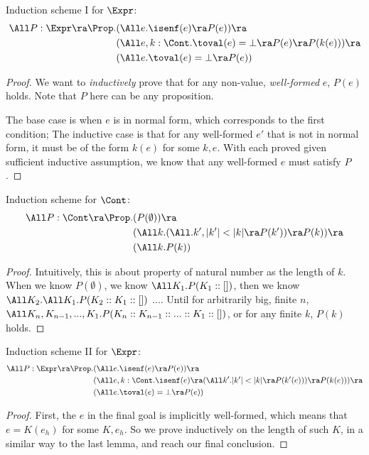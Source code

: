 \begin{lemma}
Induction scheme I for $\Expr$:
\begin{align*}
\All P: \Expr \ra \Prop.
  &(\All e. \isenf(e) \ra P(e)) \ra \\
  &(\All e, k: \Cont . \toval(e) = \bot \ra P(e) \ra P(k(e))) \ra\\
  &(\All e. \toval(e) = \bot \ra P(e))
\end{align*}
\end{lemma}
\begin{proof}
We want to \emph{inductively} prove that for any non-value, \emph{well-formed} $e$, $P(e)$ holds.
Note that $P$ here can be any proposition.

The base case is when $e$ is in normal form, which corresponds to the first condition;
The inductive case is that for any well-formed $e'$ that is not in normal form,
it must be of the form $k(e)$ for some $k, e$. With each proved given sufficient inductive
assumption, we know that any well-formed $e$ must satisfy $P$.
\end{proof}

\begin{lemma}
  Induction scheme for $\Cont$:
  \begin{align*}
    \All P: \Cont \ra \Prop.
      &(P(\emptyset)) \ra \\
      &(\All k. (\All. k', |k'| < |k| \ra P(k')) \ra P(k)) \ra \\
      &(\All k. P(k))
  \end{align*}
\end{lemma}
\begin{proof}
    Intuitively, this is about property of natural number as the length of $k$.
    When we know $P(\emptyset)$, we know $\All K_1. P(K_1::[])$, then we know
    $\All K_2. \All K_1. P(K_2::K_1::[])$ .... Until for arbitrarily big, finite $n$,
    $\All K_n, K_{n - 1}, ..., K_1. P(K_n::K_{n-1}::...::K_1::[])$, or for any finite
    $k$, $P(k)$ holds.
\end{proof}

\begin{lemma}
Induction scheme II for $\Expr$:
\begin{align*}
\All P: \Expr \ra \Prop.
  &(\All e. \isenf(e) \ra P(e)) \ra \\
  &(\All e, k: \Cont . \isenf(e) \ra (\All k'. |k'| < |k| \ra P (k'(e))) \ra P(k(e))) \ra\\
  &(\All e. \toval(e) = \bot \ra P(e))
\end{align*}
\end{lemma}
\begin{proof}
    First, the $e$ in the final goal is implicitly well-formed, which means that $e = K(e_h)$
    for some $K, e_h$. So we prove inductively on the length of such $K$, in a similar way to
    the last lemma, and reach our final conclusion.
\end{proof}

